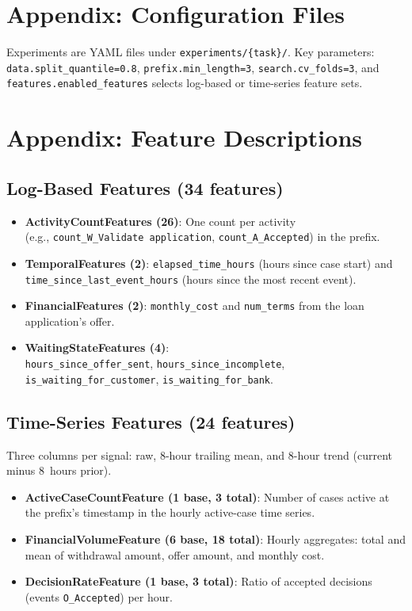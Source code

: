 \documentclass[runningheads]{llncs}
\begin{document}
\section{Appendix: Configuration Files}
\label{app:configs}
Experiments are YAML files under
\texttt{experiments/\{task\}/}. Key parameters:
\texttt{data.split\_quantile=0.8},
\texttt{prefix.min\_length=3},
\texttt{search.cv\_folds=3}, and
\texttt{features.enabled\_features} selects
log-based or time-series feature sets.

\section{Appendix: Feature Descriptions}
\label{app:features}

\subsection{Log-Based Features (34 features)}

\begin{itemize}
    \item \textbf{ActivityCountFeatures (26)}: One count per activity\\
          \quad(e.g., \texttt{count\_W\_Validate application},
          \texttt{count\_A\_Accepted}) in the prefix.
    \item \textbf{TemporalFeatures (2)}:
          \texttt{elapsed\_time\_hours} (hours since case start) and
          \texttt{time\_since\_last\_event\_hours} (hours since the
          most recent event).
    \item \textbf{FinancialFeatures (2)}:
          \texttt{monthly\_cost} and \texttt{num\_terms}
          from the loan application's offer.
    \item \textbf{WaitingStateFeatures (4)}:\\
          \texttt{hours\_since\_offer\_sent},
          \texttt{hours\_since\_incomplete},\\
          \texttt{is\_waiting\_for\_customer},
          \texttt{is\_waiting\_for\_bank}.
\end{itemize}

\subsection{Time-Series Features (24 features)}

Three columns per signal: raw, 8-hour trailing mean,
and 8-hour trend (current minus 8~hours prior).

\begin{itemize}
    \item \textbf{ActiveCaseCountFeature (1 base, 3 total)}:
          Number of cases active at the prefix's timestamp in the hourly
          active-case time series.
    \item \textbf{FinancialVolumeFeature (6 base, 18 total)}:
          Hourly aggregates: total and mean of withdrawal amount,
          offer amount, and monthly cost.
    \item \textbf{DecisionRateFeature (1 base, 3 total)}:
          Ratio of accepted decisions (events \texttt{O\_Accepted})
          per hour.
\end{itemize}
\end{document}
